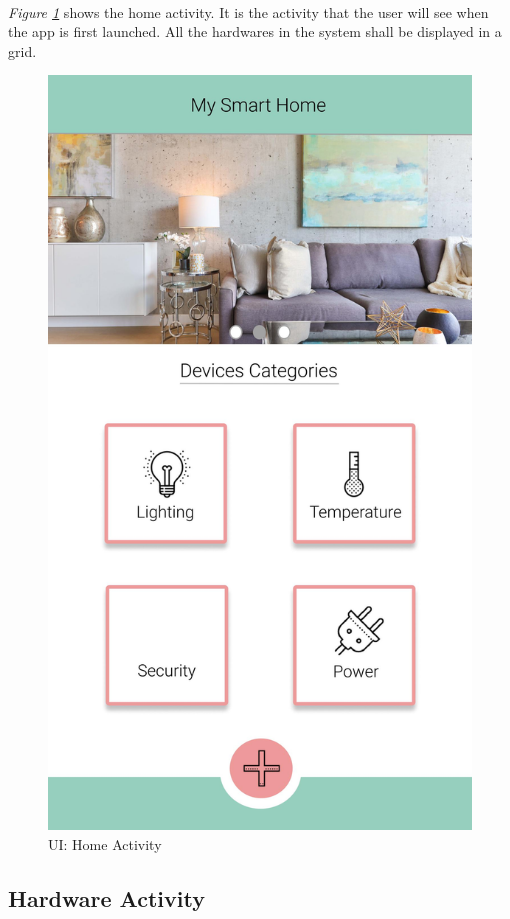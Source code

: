 \documentclass[12pt, oneside, a4paper]{book}
\begin{document}
		\paragraph{} \textit{Figure \ref{fig:activity_home}} shows the home activity. It is the activity that the user will see when the app is first launched. All the hardwares in the system shall be displayed in a grid.
		\begin{figure}[H]
			\centering
			\includegraphics[width=.5\linewidth]{img/activity_home.jpg}
			\caption{UI: Home Activity}
			\label{fig:activity_home}
		\end{figure}
		\newpage\subsection{Hardware Activity}
\end{document}
